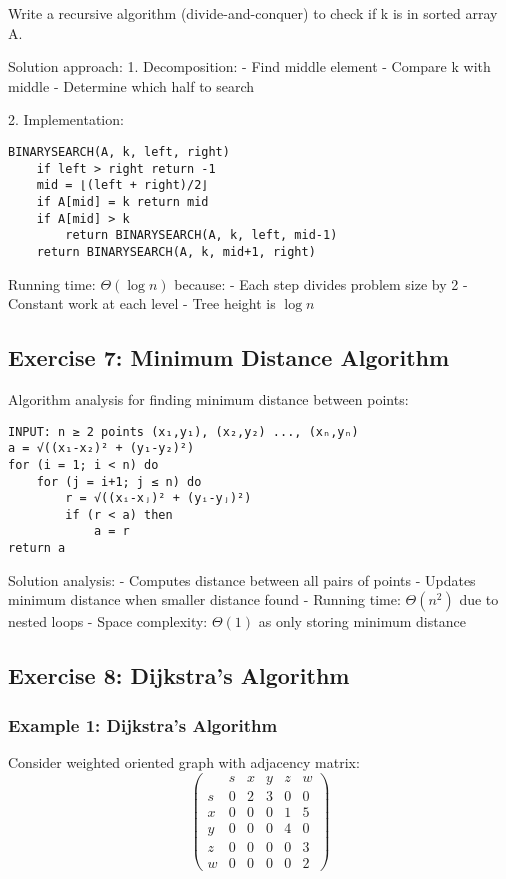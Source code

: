 Write a recursive algorithm (divide-and-conquer) to check if k is in sorted array A.

Solution approach:
1. Decomposition:
   - Find middle element
   - Compare k with middle
   - Determine which half to search

2. Implementation:
\begin{verbatim}
BINARYSEARCH(A, k, left, right)
    if left > right return -1
    mid = ⌊(left + right)/2⌋
    if A[mid] = k return mid
    if A[mid] > k
        return BINARYSEARCH(A, k, left, mid-1)
    return BINARYSEARCH(A, k, mid+1, right)
\end{verbatim}

Running time: $\Theta(\log n)$ because:
- Each step divides problem size by 2
- Constant work at each level
- Tree height is $\log n$

\subsection*{Exercise 7: Minimum Distance Algorithm}

Algorithm analysis for finding minimum distance between points:
\begin{verbatim}
INPUT: n ≥ 2 points (x₁,y₁), (x₂,y₂) ..., (xₙ,yₙ)
a = √((x₁-x₂)² + (y₁-y₂)²)
for (i = 1; i < n) do
    for (j = i+1; j ≤ n) do
        r = √((xᵢ-xⱼ)² + (yᵢ-yⱼ)²)
        if (r < a) then
            a = r
return a
\end{verbatim}

Solution analysis:
- Computes distance between all pairs of points
- Updates minimum distance when smaller distance found
- Running time: $\Theta(n^2)$ due to nested loops
- Space complexity: $\Theta(1)$ as only storing minimum distance

\subsection*{Exercise 8: Dijkstra's Algorithm}

\subsubsection*{Example 1: Dijkstra's Algorithm}

Consider weighted oriented graph with adjacency matrix:
\[
\begin{pmatrix}
    & s & x & y & z & w \\
s & 0 & 2 & 3 & 0 & 0 \\
x & 0 & 0 & 0 & 1 & 5 \\
y & 0 & 0 & 0 & 4 & 0 \\
z & 0 & 0 & 0 & 0 & 3 \\
w & 0 & 0 & 0 & 0 & 2
\end{pmatrix}
\]


